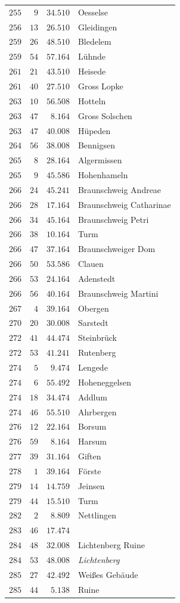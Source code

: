 \begin{longtable}{@{}rrrp{.61\linewidth}@{}}
\(255\)&\(9\)&\(34.510\)&\raggedright Oesselse\tabularnewline
\(256\)&\(13\)&\(26.510\)&\raggedright Gleidingen\tabularnewline
\(259\)&\(26\)&\(48.510\)&\raggedright Bledelem\tabularnewline
\(259\)&\(54\)&\(57.164\)&\raggedright Lühnde\tabularnewline
\(261\)&\(21\)&\(43.510\)&\raggedright Heisede\tabularnewline
\(261\)&\(40\)&\(27.510\)&\raggedright Gross Lopke\tabularnewline
\(263\)&\(10\)&\(56.508\)&\raggedright Hotteln\tabularnewline
\(263\)&\(47\)&\(8.164\)&\raggedright Gross Solschen\tabularnewline
\(263\)&\(47\)&\(40.008\)&\raggedright Hüpeden\tabularnewline
\(264\)&\(56\)&\(38.008\)&\raggedright Bennigsen\tabularnewline
\(265\)&\(8\)&\(28.164\)&\raggedright Algermissen\tabularnewline
\(265\)&\(9\)&\(45.586\)&\raggedright Hohenhameln\tabularnewline
\(266\)&\(24\)&\(45.241\)&\raggedright Braunschweig Andreae\tabularnewline
\(266\)&\(28\)&\(17.164\)&\raggedright Braunschweig Catharinae\tabularnewline
\(266\)&\(34\)&\(45.164\)&\raggedright Braunschweig Petri\tabularnewline
\(266\)&\(38\)&\(10.164\)&\raggedright Turm\tabularnewline
\(266\)&\(47\)&\(37.164\)&\raggedright Braunschweiger Dom\tabularnewline
\(266\)&\(50\)&\(53.586\)&\raggedright Clauen\tabularnewline
\(266\)&\(53\)&\(24.164\)&\raggedright Adenstedt\tabularnewline
\(266\)&\(56\)&\(40.164\)&\raggedright Braunschweig Martini\tabularnewline
\(267\)&\(4\)&\(39.164\)&\raggedright Obergen\tabularnewline
\(270\)&\(20\)&\(30.008\)&\raggedright Sarstedt\tabularnewline
\(272\)&\(41\)&\(44.474\)&\raggedright Steinbrück\tabularnewline
\(272\)&\(53\)&\(41.241\)&\raggedright Rutenberg\tabularnewline
\(274\)&\(5\)&\(9.474\)&\raggedright Lengede\tabularnewline
\(274\)&\(6\)&\(55.492\)&\raggedright Hoheneggelsen\tabularnewline
\(274\)&\(18\)&\(34.474\)&\raggedright Addlum\tabularnewline
\(274\)&\(46\)&\(55.510\)&\raggedright Ahrbergen\tabularnewline
\(276\)&\(12\)&\(22.164\)&\raggedright Borsum\tabularnewline
\(276\)&\(59\)&\(8.164\)&\raggedright Harsum\tabularnewline
\(277\)&\(39\)&\(31.164\)&\raggedright Giften\tabularnewline
\(278\)&\(1\)&\(39.164\)&\raggedright Förste\tabularnewline
\(279\)&\(14\)&\(14.759\)&\raggedright Jeinsen\tabularnewline
\(279\)&\(44\)&\(15.510\)&\raggedright Turm\tabularnewline
\(282\)&\(2\)&\(8.809\)&\raggedright Nettlingen\tabularnewline
\(283\)&\(46\)&\(17.474\)&\raggedright \tabularnewline
\(284\)&\(48\)&\(32.008\)&\raggedright Lichtenberg Ruine\tabularnewline
\(284\)&\(53\)&\(48.008\)&\raggedright \textit{Lichtenberg}\tabularnewline
\(285\)&\(27\)&\(42.492\)&\raggedright Weißes Gebäude\tabularnewline
\(285\)&\(44\)&\(5.138\)&\raggedright Ruine\tabularnewline
\end{longtable}
\endgroup

